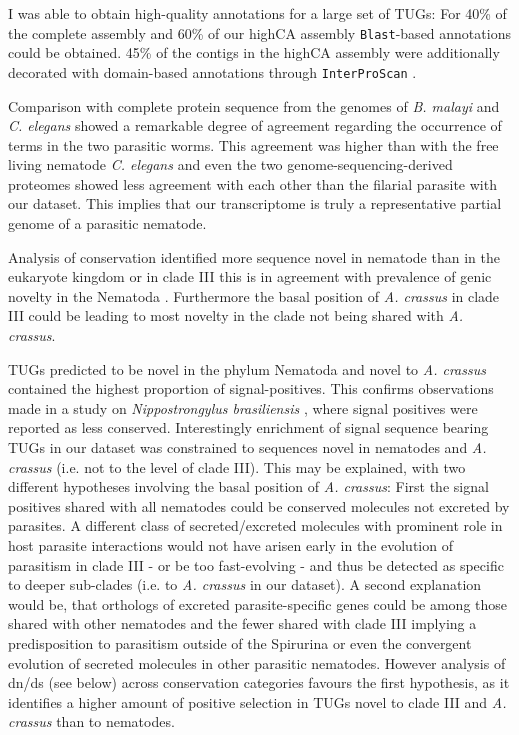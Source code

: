 I was able to obtain high-quality annotations for a large set of
TUGs: For 40\% of the complete assembly and 60\% of our highCA
assembly \texttt{Blast}-based annotations could be obtained. 45\% of
the contigs in the highCA assembly were additionally decorated with
domain-based annotations through \texttt{InterProScan}
\cite{pmid11590104}.

Comparison with complete protein sequence from the genomes of
\textit{B. malayi} and \textit{C. elegans} showed a remarkable degree
of agreement regarding the occurrence of terms in the two parasitic
worms. This agreement was higher than with the free living nematode
\textit{C. elegans} and even the two genome-sequencing-derived
proteomes showed less agreement with each other than the filarial
parasite with our dataset. This implies that our transcriptome is
truly a representative partial genome
\cite{parkinson_partigene--constructing_2004} of a parasitic nematode.

Analysis of conservation identified more sequence novel in nematode
than in the eukaryote kingdom or in clade III this is in agreement
with prevalence of genic novelty in the Nematoda
\cite{wasmuth_extent_2008}. Furthermore the basal position of
\textit{A. crassus} in clade III could be leading to most novelty in
the clade not being shared with \textit{A. crassus}.

TUGs predicted to be novel in the phylum Nematoda and novel to
\textit{A. crassus} contained the highest proportion of
signal-positives. This confirms observations made in a study on
\textit{Nippostrongylus brasiliensis} \cite{harcus_signal_2004}, where
signal positives were reported as less conserved. Interestingly
enrichment of signal sequence bearing TUGs in our dataset was
constrained to sequences novel in nematodes and \textit{A. crassus}
(i.e. not to the level of clade III). This may be explained, with two
different hypotheses involving the basal position of
\textit{A. crassus}: First the signal positives shared with all
nematodes could be conserved molecules not excreted by parasites. A
different class of secreted/excreted molecules with prominent role in
host parasite interactions would not have arisen early in the
evolution of parasitism in clade III - or be too fast-evolving - and
thus be detected as specific to deeper sub-clades (i.e. to
\textit{A. crassus} in our dataset). A second explanation would be,
that orthologs of excreted parasite-specific genes could be among
those shared with other nematodes and the fewer shared with clade III
implying a predisposition to parasitism outside of the Spirurina or
even the convergent evolution of secreted molecules in other parasitic
nematodes. However analysis of dn/ds (see below) across conservation
categories favours the first hypothesis, as it identifies a higher
amount of positive selection in TUGs novel to clade III and
\textit{A. crassus} than to nematodes.

